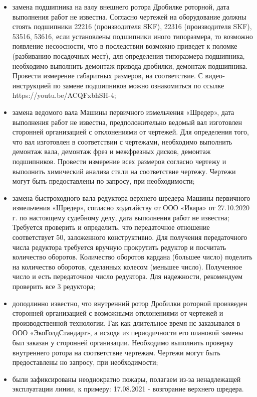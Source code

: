 \begin{itemize}
\item	
 замена подшипника на валу внешнего ротора Дробилке роторной, дата выполнения работ не известна. Согласно чертежей на оборудование должны стоять подшипники 22216 (производителя SKF), 22316 (производителя SKF), 53516, 53616, если установлены подшипники иного типоразмера, то возможно появление несоосности, что в последствии возможно приведет к поломке (разбиванию посадочных мест), для определения типоразмера подшипника, необходимо выполнить демонтаж привода дробилки, демонтаж подшипника. Провести измерение габаритных размеров, на соответствие. С видео­инструкцией по замене подшипников можно ознакомиться по ссылке https://youtu.be/ACQFxbhSH-4;
\item
 замена ведомого вала Машины первичного измельчения «Шредер», дата выполнения работ не известна, предположительно ведомый вал изготовлен сторонней организацией с отклонениями от чертежей. Для определения того, что вал изготовлен в соответствии с чертежами, необходимо выполнить демонтаж вала, демонтаж фрез и межфрезных дисков, демонтаж подшипников. Провести измерение всех размеров согласно чертежу и выполнить химический анализа стали на соответствие чертежу. Чертежи могут быть предоставлены по запросу, при необходимости;
\item	
 замена быстроходного вала редуктора верхнего шредера Машины первичного измельчения «Шредер», согласно ходатайству от ООО «Икара» от 27.10.2020 г. по настоящему судебному делу, дата выполнения работ не известна; Требуется проверить и определить, что передаточное отношение соответствует 50, заложенного конструктивно. Для получения передаточного числа редуктора требуется вручную прокрутить редуктор и посчитать количество оборотов. Количество оборотов кардана (большее число) поделить на количество оборотов, сделанных колесом (меньшее число). Полученное 	число и есть передаточное число редуктора. Для надежности, рекомендуем проверить все 3 редуктора;
\item	
 доподлинно известно, что внутренний ротор Дробилки роторной произведен сторонней организацией с возможными отклонениями от чертежей и производственной технологии. Гак как длительное время нс заказывался в ООО «ЭкоГолдСтандарт», а исходя из периодичности его плановой замены был заказан у сторонней организации. Необходимо выполнить проверку внутреннего ротора на соответствие чертежам. Чертежи могут быть предоставлены но запросу, при необходимости;
\item	
 были зафиксированы неоднократно пожары, полагаем из-за ненадлежащей эксплуатации линии, к примеру: 17.08.2021 - возгорание верхнего шредера.
\end{itemize}




